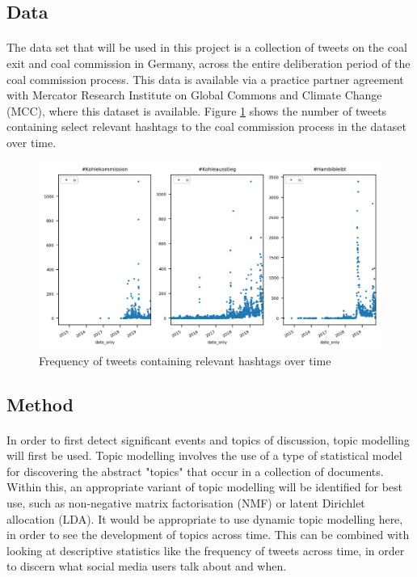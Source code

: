 \documentclass[10pt,twocolumn,letterpaper]{article}
\begin{document}
\subsection{Data}

\paragraph{} The data set that will be used in this project is a collection of tweets on the coal exit and coal commission in Germany, across the entire deliberation period of the coal commission process. This data is available via a practice partner agreement with Mercator Research Institute on Global Commons and Climate Change (MCC), where this dataset is available. Figure \ref{fig:hashtags_time} shows the number of tweets containing select relevant hashtags to the coal commission process in the dataset over time. 

\begin{figure} [ht!]
\begin{center}
   \includegraphics[width=0.8\linewidth]{figures/hashtags_time}
\end{center}
   \caption{Frequency of tweets containing relevant hashtags over time}
\label{fig:hashtags_time}
\end{figure}

\subsection{Method}
\paragraph{} In order to first detect significant events and topics of discussion, topic modelling will first be used. Topic modelling involves the use of a type of statistical model for discovering the abstract "topics" that occur in a collection of documents. Within this, an appropriate variant of topic modelling will be identified for best use, such as non-negative matrix factorisation (NMF) or latent Dirichlet allocation (LDA). It would be appropriate to use dynamic topic modelling here, in order to see the development of topics across time. This can be combined with looking at descriptive statistics like the frequency of tweets across time, in order to discern what social media users talk about and when. 
\end{document}
